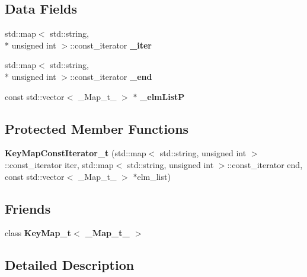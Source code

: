 \subsection*{Data Fields}
\begin{DoxyCompactItemize}
\item 
std\-::map$<$ std\-::string, \\*
unsigned int $>$\-::const\-\_\-iterator {\bfseries \-\_\-iter}\label{classhistmgr_1_1KeyMapConstIterator__t_a80de00a5a879add47244319e194c550a}

\item 
std\-::map$<$ std\-::string, \\*
unsigned int $>$\-::const\-\_\-iterator {\bfseries \-\_\-end}\label{classhistmgr_1_1KeyMapConstIterator__t_a83ae501c29ac9a9f7fcd51d9971a9fb1}

\item 
const std\-::vector$<$ \-\_\-\-Map\-\_\-t\-\_\- $>$ $\ast$ {\bfseries \-\_\-elm\-List\-P}\label{classhistmgr_1_1KeyMapConstIterator__t_ae70832f44812b9a959ae5213f46228bf}

\end{DoxyCompactItemize}
\subsection*{Protected Member Functions}
\begin{DoxyCompactItemize}
\item 
{\bfseries Key\-Map\-Const\-Iterator\-\_\-t} (std\-::map$<$ std\-::string, unsigned int $>$\-::const\-\_\-iterator iter, std\-::map$<$ std\-::string, unsigned int $>$\-::const\-\_\-iterator end, const std\-::vector$<$ \-\_\-\-Map\-\_\-t\-\_\- $>$ $\ast$elm\-\_\-list)\label{classhistmgr_1_1KeyMapConstIterator__t_a6558bc7bfcfb2688625a19ca1638c25e}

\end{DoxyCompactItemize}
\subsection*{Friends}
\begin{DoxyCompactItemize}
\item 
class {\bfseries Key\-Map\-\_\-t$<$ \-\_\-\-Map\-\_\-t\-\_\- $>$}\label{classhistmgr_1_1KeyMapConstIterator__t_a191ea493c1085e4505ff75fc2371f4fc}

\end{DoxyCompactItemize}


\subsection{Detailed Description}
